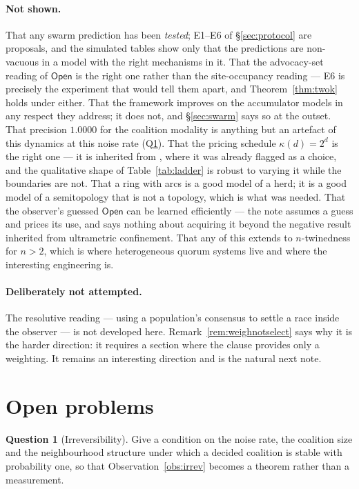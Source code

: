 \documentclass[11pt,a4paper]{article}
\theoremstyle{plain}
\theoremstyle{definition}
\newtheorem{question}[theorem]{Question}
\theoremstyle{remark}
\newcommand{\Open}{\mathsf{Open}}
\begin{document}
\paragraph{Not shown.} That any swarm prediction has been \emph{tested};
E1--E6 of \S\ref{sec:protocol} are proposals, and the simulated tables show
only that the predictions are non-vacuous in a model with the right mechanisms
in it. That the advocacy-set reading of $\Open$ is the right one rather than
the site-occupancy reading --- E6 is precisely the experiment that would tell
them apart, and Theorem~\ref{thm:twok} holds under either. That the framework
improves on the accumulator models in any respect they address; it does not,
and \S\ref{sec:swarm} says so at the outset. That precision $1.0000$ for the
coalition modality is
anything but an artefact of this dynamics at this noise rate
(Q\ref{q:irrev}). That the pricing schedule $\kappa(d) = 2^d$ is the right one
--- it is inherited from \cite{game}, where it was already flagged as a choice,
and the qualitative shape of Table~\ref{tab:ladder} is robust to varying it
while the boundaries are not. That a ring with arcs is a good model of a herd;
it is a good model of a semitopology that is not a topology, which is what was
needed. That the observer's guessed $\Open$ can be learned efficiently --- the
note assumes a guess and prices its use, and says nothing about acquiring it
beyond the negative result inherited from ultrametric confinement. That any of
this extends to $n$-twinedness for $n > 2$, which is where heterogeneous quorum
systems live and where the interesting engineering is.

\paragraph{Deliberately not attempted.} The resolutive reading --- using a
population's consensus to settle a race inside the observer --- is not developed
here. Remark~\ref{rem:weighnotselect} says why it is the harder direction: it
requires a section where the clause provides only a weighting. It remains an
interesting direction and is the natural next note.

\section{Open problems}\label{sec:open}

\begin{question}[Irreversibility]\label{q:irrev}
Give a condition on the noise rate, the coalition size and the neighbourhood
structure under which a decided coalition is stable with probability one, so
that Observation~\ref{obs:irrev} becomes a theorem rather than a measurement.
\end{question}
\end{document}
